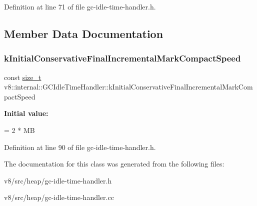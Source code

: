 Definition at line 71 of file gc-\/idle-\/time-\/handler.\+h.



\subsection{Member Data Documentation}
\mbox{\label{classv8_1_1internal_1_1GCIdleTimeHandler_a3cb5f70b983d7221ee62a57d6650a279}} 
\subsubsection{\texorpdfstring{k\+Initial\+Conservative\+Final\+Incremental\+Mark\+Compact\+Speed}{kInitialConservativeFinalIncrementalMarkCompactSpeed}}
{\footnotesize\ttfamily const \mbox{\hyperlink{classsize__t}{size\+\_\+t}} v8\+::internal\+::\+G\+C\+Idle\+Time\+Handler\+::k\+Initial\+Conservative\+Final\+Incremental\+Mark\+Compact\+Speed\hspace{0.3cm}{\ttfamily [static]}}

{\bfseries Initial value\+:}
\begin{DoxyCode}
=
      2 * MB
\end{DoxyCode}


Definition at line 90 of file gc-\/idle-\/time-\/handler.\+h.



The documentation for this class was generated from the following files\+:\begin{DoxyCompactItemize}
\item 
v8/src/heap/gc-\/idle-\/time-\/handler.\+h\item 
v8/src/heap/gc-\/idle-\/time-\/handler.\+cc\end{DoxyCompactItemize}
